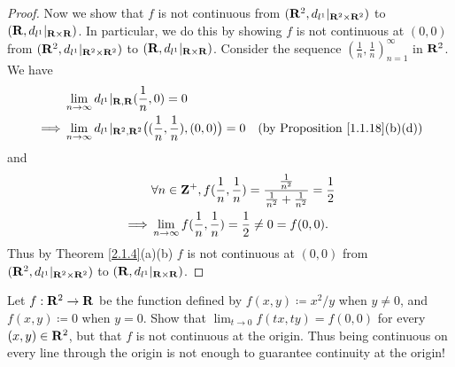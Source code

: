 \begin{proof}
    Now we show that \(f\) is not continuous from \((\mathbf{R}^2, d_{l^1}|_{\mathbf{R}^2 \times \mathbf{R}^2})\) to \((\mathbf{R}, d_{l^1}|_{\mathbf{R} \times \mathbf{R}})\).
    In particular, we do this by showing \(f\) is not continuous at \((0, 0)\) from \((\mathbf{R}^2, d_{l^1}|_{\mathbf{R}^2 \times \mathbf{R}^2})\) to \((\mathbf{R}, d_{l^1}|_{\mathbf{R} \times \mathbf{R}})\).
    Consider the sequence \((\frac{1}{n}, \frac{1}{n})_{n = 1}^\infty\) in \(\mathbf{R}^2\).
    We have
    \begin{align*}
                 & \lim_{n \to \infty} d_{l^1}|_{\mathbf{R}, \mathbf{R}}(\frac{1}{n}, 0) = 0                                                                              \\
        \implies & \lim_{n \to \infty} d_{l^1}|_{\mathbf{R}^2, \mathbf{R}^2}\big((\frac{1}{n}, \frac{1}{n}), (0, 0)\big) = 0 & \text{(by Proposition \ref{1.1.18}(b)(d))}
    \end{align*}
    and
    \begin{align*}
                 & \forall n \in \mathbf{Z}^+, f(\frac{1}{n}, \frac{1}{n}) = \frac{\frac{1}{n^2}}{\frac{1}{n^2} + \frac{1}{n^2}} = \frac{1}{2} \\
        \implies & \lim_{n \to \infty} f(\frac{1}{n}, \frac{1}{n}) = \frac{1}{2} \neq 0 = f(0, 0).
    \end{align*}
    Thus by Theorem \ref{2.1.4}(a)(b) \(f\) is not continuous at \((0, 0)\) from \((\mathbf{R}^2, d_{l^1}|_{\mathbf{R}^2 \times \mathbf{R}^2})\) to \((\mathbf{R}, d_{l^1}|_{\mathbf{R} \times \mathbf{R}})\).
\end{proof}

\begin{exercise}\label{ex 2.2.12}
    Let \(f: \mathbf{R}^2 \to \mathbf{R}\) be the function defined by \(f(x, y) \coloneqq x^2 / y\) when \(y \neq 0\), and \(f(x, y) \coloneqq 0\) when \(y = 0\).
    Show that \(\lim_{t \to 0} f(tx, ty) = f(0, 0)\) for every \((x, y) \in \mathbf{R}^2\), but that \(f\) is not continuous at the origin.
    Thus being continuous on every line through the origin is not enough to guarantee continuity at the origin!
\end{exercise}


